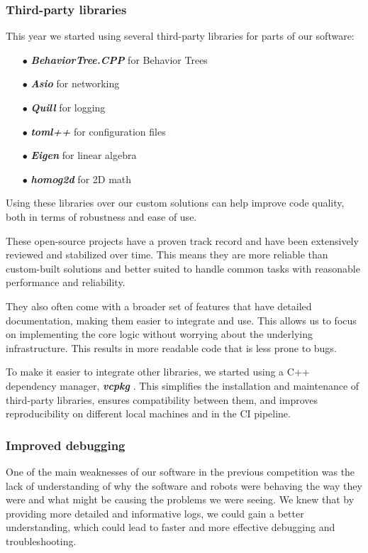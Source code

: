 \documentclass[runningheads]{llncs}
\begin{document}
\subsubsection{Third-party libraries} \label{section:software_3rdparty}
This year we started using several third-party libraries for parts of our software:
\begin{enumerate}
    \item[$\bullet$] \textbf{\textit{BehaviorTree.CPP}} \cite{ref_3rd-party_btcpp} for Behavior Trees
    \item[$\bullet$] \textbf{\textit{Asio}} \cite{ref_3rd-party_asio} for networking
    \item[$\bullet$] \textbf{\textit{Quill}} \cite{ref_3rd-party_quill} for logging
    \item[$\bullet$] \textbf{\textit{toml++}} \cite{ref_3rd-party_tomlplusplus} for configuration files
    \item[$\bullet$] \textbf{\textit{Eigen}} \cite{ref_3rd-party_eigen} for linear algebra
    \item[$\bullet$] \textbf{\textit{homog2d}} \cite{ref_3rd-party_homog2d} for 2D math
\end{enumerate}

\indent Using these libraries over our custom solutions can help improve code quality, both in terms of robustness and ease of use.

\indent These open-source projects have a proven track record and have been extensively reviewed and stabilized over time. This means they are more reliable than custom-built solutions and better suited to handle common tasks with reasonable performance and reliability.

\indent They also often come with a broader set of features that have detailed documentation, making them easier to integrate and use. This allows us to focus on implementing the core logic without worrying about the underlying infrastructure. This results in more readable code that is less prone to bugs.

\indent To make it easier to integrate other libraries, we started using a C++ dependency manager, \textbf{\textit{vcpkg}} \cite{ref_3rd-party_vcpkg}. This simplifies the installation and maintenance of third-party libraries, ensures compatibility between them, and improves reproducibility on different local machines and in the CI pipeline.

\subsubsection{Improved debugging}
One of the main weaknesses of our software in the previous competition was the lack of understanding of why the software and robots were behaving the way they were and what might be causing the problems we were seeing. We knew that by providing more detailed and informative logs, we could gain a better understanding, which could lead to faster and more effective debugging and troubleshooting.
\end{document}
